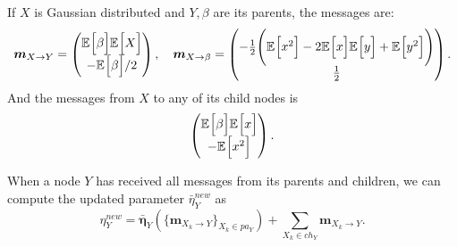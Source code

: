 \begin{exampleth}
     If \( X \) is Gaussian distributed and \( Y, \beta \) are its parents, the messages are:
     \[
           \bm{m}_{X \to Y} = \begin{pmatrix}
                \mathbb{E}_{}\Big[\beta\Big]\mathbb{E}_{}\Big[X\Big]\\
                - \mathbb{E}_{}\Big[\beta\Big]/2
           \end{pmatrix}, \quad
           \bm{m}_{X \to \beta} = \begin{pmatrix}
               -\frac{1}{2}\Bigg( \mathbb{E}_{}\Big[x^2\Big] - 2\mathbb{E}_{}\Big[x\Big]\mathbb{E}_{}\Big[y\Big] + \mathbb{E}_{}\Big[y^2\Big] \Bigg)\\
               \frac{1}{2}
          \end{pmatrix}.
     \]
     And the messages from \( X \) to any of its child nodes is
     \[
          \begin{pmatrix}
               \mathbb{E}_{}\Big[\beta\Big]\mathbb{E}_{}\Big[x\Big]\\
               - \mathbb{E}_{}\Big[x^2\Big]
          \end{pmatrix}.
     \]
\end{exampleth}

When a node \( Y \) has received all messages from its parents and children, we can compute the updated parameter \( \bar{\eta}^{new}_Y \) as
\[
     \eta^{new}_Y = \bar{\bm{\eta}}_Y(\{ \bm{m}_{X_k \to Y} \}_{X_k \in pa_Y}) + \sum_{X_k \in ch_Y}\bm{m}_{X_k \to Y}.
\]

